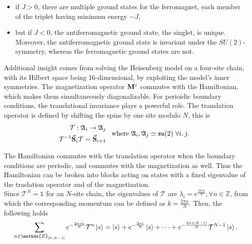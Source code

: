 \documentclass{homework}
\begin{document}
\begin{itemize}
    \item if $J>0$, there are multiple ground states for the ferromagnet, each member of the triplet having minimum energy $-J$,
    \item but if $J<0$, the antiferromagnetic ground state, the singlet, is unique. Moreover, the antiferromagnetic ground state is invariant under the $SU(2)$-symmetry, whereas the ferromagnetic ground states are not. \\
\end{itemize}

Additional insight comes from solving the Heisenberg model on a four-site chain, with its Hilbert space being 16-dimensional, by exploiting the model's inner symmetries. The magnetization operator ${\bf M}^z$ commutes with the Hamiltonian, which makes them simultaneously diagonalizable. For perioidic boundary conditions, the translational invariance plays a powerful role. The translation operator is defined by shifting the spins by one site modulo $N$, this is 
\begin{equation}
\begin{split}
    \mathcal{T} : \mathfrak{A}_i \rightarrow \mathfrak{A}_j \\
    \mathcal{T}^{-1} \vec{\bf S}_i \mathcal{T} = \vec{{\bf S}}_{i+1}
\end{split}
\begin{array}{c}
     \textnormal{ where } \mathfrak{A}_i, \mathfrak{A}_j \simeq \mathfrak{su}(2) \textnormal{ } \forall i,j. 
\end{array}
\end{equation}

The Hamiltonian commutes with the translation operator when the boundary conditions are periodic, and commutes with the magnetization as well. Thus the Hamiltonian can be broken into blocks acting on states with a fixed eigenvalue of the traslation operator and of the magnetization. \\

Since $\mathcal{T}^N = \mathds{1}$ for an $N$-site chain, the eigenvalues of $\mathcal{T}$ are $\lambda_i = e^{\frac{2\pi i n}{N}}, \forall n \in \mathds{Z}$, from which the corresponding momentum can be defined as $k = \frac{2\pi n}{N}$. Then, the following holds 
$$
    \sum_{n \in \mathds{Z}_{[0, N-1]}} e^{-\frac{2\pi i n}{N}} \mathcal{T}^n \ket{s} = \ket{s} + e^{-\frac{2\pi i}{N}} \ket{s} + \cdots + e^{-\frac{2\pi i (N-1)}{N}}\mathcal{T}^{N-1} \ket{s}.
$$
\end{document}

